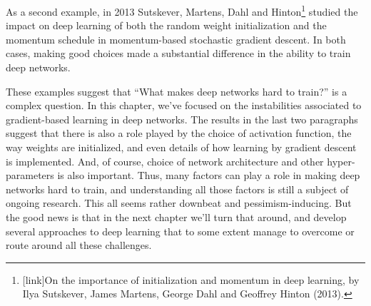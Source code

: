 \documentclass[a4paper,twoside,10pt]{book}
\begin{document}
As a second example, in 2013 Sutskever, Martens, Dahl and Hinton\footnote{[link]On the importance of initialization and momentum in deep learning, by Ilya Sutskever, James Martens, George Dahl and Geoffrey Hinton (2013).} studied the impact on deep learning of both the random weight initialization and the momentum schedule in momentum-based stochastic gradient descent. In both cases, making good choices made a substantial difference in the ability to train deep networks.

These examples suggest that ``What makes deep networks hard to train?'' is a complex question. In this chapter, we've focused on the instabilities associated to gradient-based learning in deep networks. The results in the last two paragraphs suggest that there is also a role played by the choice of activation function, the way weights are initialized, and even details of how learning by gradient descent is implemented. And, of course, choice of network architecture and other hyper-parameters is also important. Thus, many factors can play a role in making deep networks hard to train, and understanding all those factors is still a subject of ongoing research. This all seems rather downbeat and pessimism-inducing. But the good news is that in the next chapter we'll turn that around, and develop several approaches to deep learning that to some extent manage to overcome or route around all these challenges.
\end{document}
